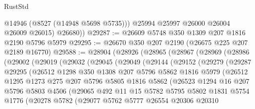 \begin{lexlean}{RustStd}
\begin{coremodule}
            @14946
            (@8527 (@14948 @5698 @5735)))
          @25994
          @25997
          @26000
          @26004
          @26009
          @26015)
        @26680))
@29287 := @26609 @5748 @350 @1309 @207 @1816 @2190 @5796 @5979
@29295 := @26670 @350 @207 @2190 (@26675 @225 @207 @2189 @16770)
@29588 := @28904
    (@28926
      (@28965
        (@28967
          (@28969
            (@28986
              (@29002
                (@29019
                  (@29032
                    (@29045
                      (@29049
                        (@29144
                          (@29152
                            (@29279
                              (@29287
                                @29295
                                (@26512
                                  @1298
                                  @350
                                  @1308
                                  @207
                                  @5796
                                  @5862
                                  @1816
                                  @5979
                                  (@26512
                                    @1295
                                    @1273
                                    @275
                                    @207
                                    @5796
                                    @5805
                                    @1816
                                    @5862
                                    (@26523
                                      @1294
                                      @16
                                      @207
                                      @5796
                                      @5803
                                      @4506
                                      (@29065
                                        @492
                                        @11
                                        @15
                                        @5782
                                        @5795
                                        @5802
                                        @1831
                                        @5754
                                        @1776
                                        (@20278
                                          @5782
                                          (@29077
                                            @5762
                                            @5777
                                            @26554
                                            @20306
                                            @20310

\end{coremodule}
\end{lexlean}
